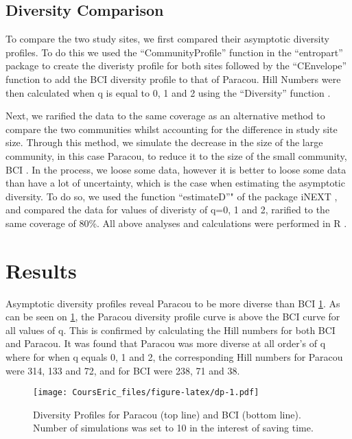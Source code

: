 \documentclass[fleqn,10pt]{ArtEcoFoG} %
\begin{document}
\subsection{Diversity Comparison}\label{diversity-comparison}

To compare the two study sites, we first compared their asymptotic
diversity profiles. To do this we used the ``CommunityProfile'' function
in the ``entropart'' package \citep{Marcon2014c} to create the diveristy
profile for both sites followed by the ``CEnvelope'' function
\citep{Marcon2014c} to add the BCI diversity profile to that of Paracou.
Hill Numbers were then calculated when q is equal to 0, 1 and 2 using
the ``Diversity'' function \citep{Marcon2014c}.

Next, we rarified the data to the same coverage as an alternative method
to compare the two communities whilst accounting for the difference in
study site size. Through this method, we simulate the decrease in the
size of the large community, in this case Paracou, to reduce it to the
size of the small community, BCI \citep{marcon:cel-01205813}. In the
process, we loose some data, however it is better to loose some data
than have a lot of uncertainty, which is the case when estimating the
asymptotic diversity. To do so, we used the function ``estimateD''" of
the package iNEXT \citep{hsieh2016inext}, and compared the data for
values of diveristy of q=0, 1 and 2, rarified to the same coverage of
80\%. All above analyses and calculations were performed in R \citep{R}.

\section{Results}\label{results}

Asymptotic diversity profiles reveal Paracou to be more diverse than BCI
\ref{fig:dp}. As can be seen on \ref{fig:dp}, the Paracou diversity
profile curve is above the BCI curve for all values of q. This is
confirmed by calculating the Hill numbers for both BCI and Paracou. It
was found that Paracou was more diverse at all order's of q where for
when q equals 0, 1 and 2, the corresponding Hill numbers for Paracou
were 314, 133 and 72, and for BCI were 238, 71 and 38.

\begin{figure}
\centering
\texttt{[image: CoursEric\_files/figure-latex/dp-1.pdf]}
\caption{\label{fig:dp}Diversity Profiles for Paracou (top line) and BCI
(bottom line). Number of simulations was set to 10 in the interest of
saving time.}
\end{figure}
\end{document}
